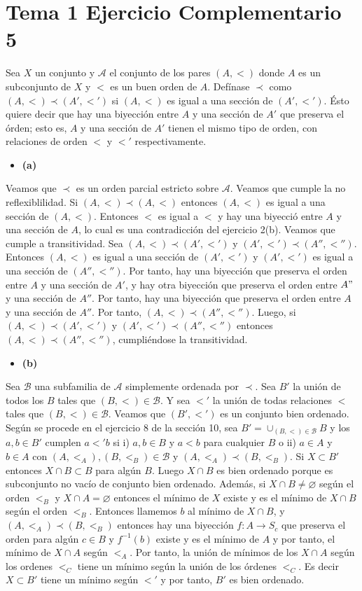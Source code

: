 \documentclass{article}
\begin{document}
\section{Tema 1 Ejercicio Complementario 5}
Sea $X$ un conjunto y $\mathcal{A}$ el conjunto de los pares $(A,<)$ donde $A$ es un subconjunto de $X$ y $<$ es un buen orden de $A$. Defínase $\prec$ como $(A,<)\prec (A',<')$ si $(A,<)$ es igual a una sección de $ (A',<')$. Ésto quiere decir que hay una biyección entre $A$ y una sección de $A'$ que preserva el órden; esto es, $A$ y una sección de $A'$ tienen el mismo tipo de orden, con relaciones de orden $<$ y $<'$ respectivamente.
\begin{itemize}
\item \bf (a)\rm
\end{itemize}
Veamos que $\prec$ es un orden parcial estricto sobre $\mathcal{A}$. Veamos que cumple la no reflexiblilidad. Si $(A,<)\prec (A,<)$ entonces $(A,<)$ es igual a una sección de $(A,<)$. Entonces $<$ es igual a $<$ y hay una biyecció  entre $A$ y una sección de $A$, lo cual es una contradicción del ejercicio 2(b). Veamos que cumple a transitividad. Sea $(A,<)\prec (A',<')$ y $(A',<')\prec (A'',<'')$. Entonces $(A,<)$ es igual a una sección de $ (A',<')$ y $(A',<')$ es igual a una sección de $ (A'',<'')$. Por tanto, hay una biyección que preserva el orden entre $A$ y una sección de $A'$, y hay otra biyección que preserva el orden entre $A"$ y una sección de $A''$. Por tanto, hay una biyección que preserva el orden entre $A$ y una sección de $A''$. Por tanto, $(A,<)\prec (A'',<'')$. Luego, si $(A,<)\prec (A',<')$ y $(A',<')\prec (A'',<'')$ entonces $(A,<)\prec (A'',<'')$, cumpliéndose la transitividad.
\begin{itemize}
\item \bf (b)\rm
\end{itemize}
Sea $\mathcal{B}$ una subfamilia de $\mathcal{A}$ simplemente ordenada por $\prec$. Sea $B'$ la unión de todos los $B$ tales que $(B,<)\in \mathcal{B}$. Y sea $<'$ la unión de todas relaciones $<$ tales que $(B,<)\in \mathcal{B}$. Veamos que $(B',<')$ es un conjunto bien ordenado. Según se procede en el ejercicio 8 de la sección 10, sea $B'=\cup_{(B,<)\in \mathcal{B}}B$ y los $a,b\in B'$ cumplen $a<'b$ si  i) $a,b\in B$ y $a<b$ para cualquier $B$ o ii) $a\in A$ y $b\in A$ con $(A,<_A),(B,<_B)\in \mathcal{B}$ y $(A,<_A)\prec(B,<_B)$. Si $X\subset B'$ entonces $X\cap B\subset B$ para algún $B$. Luego $X\cap B$ es bien ordenado porque es subconjunto no vacío de conjunto bien ordenado. Además, si $X\cap B\neq \varnothing$ según el orden $<_B$ y $X\cap A=\varnothing$ entonces el mínimo de $X$ existe y es el mínimo de $X\cap B$ según el orden $<_B$. Entonces llamemos $b$ al mínimo de $X\cap B$, y $(A,<_A)\prec(B,<_B)$ entonces hay una biyección $f:A\rightarrow S_c$ que preserva el orden para algún $c\in B$ y $f^{-1}(b)$ existe y es el mínimo de $A$ y por tanto, el mínimo de $X\cap A$ según $<_A$. Por tanto, la unión de mínimos de los $X\cap A$ según los ordenes $<_C$ tiene un mínimo según la unión de los órdenes $<_C$. Es decir $X\subset B'$ tiene un mínimo según $<'$ y por tanto, $B'$ es bien ordenado.
\end{document}
